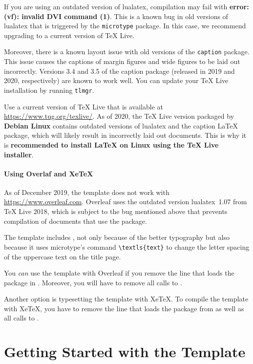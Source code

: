 If you are using an outdated version of lualatex, compilation may fail with \textbf{error: (vf): invalid DVI command (1)}. This is a known bug in old versions of lualatex that is triggered by the \texttt{microtype} package. In this case, we recommend upgrading to a current version of TeX Live.

Moreover, there is a known layout issue with old versions of the \texttt{caption} package. This issue causes the captions of margin figures and wide figures to be laid out incorrectly. Versions 3.4 and 3.5 of the caption package (released in 2019 and 2020, respectively) are known to work well. You can update your TeX Live installation by running \texttt{tlmgr}.

Use a current version of TeX Live that is available at \url{https://www.tug.org/texlive/}. As of 2020, the TeX Live version packaged by \textbf{Debian Linux} contains outdated versions of lualatex and the caption LaTeX package, which will likely result in incorrectly laid out documents. This is why it is \textbf{recommended to install LaTeX on Linux using the TeX Live installer}.

\paragraph{Using Overlaf and XeTeX}

As of December 2019, the template does not work with \url{https://www.overleaf.com}. Overleaf uses the outdated version lualatex~1.07 from TeX Live 2018, which is subject to the bug mentioned above that prevents compilation of documents that use the  package.

The template includes , not only because of the better typography but also because it uses microtype's command \verb|\textls{text}| to change the letter spacing of the uppercase text on the title page.

You \emph{can} use the template with Overleaf if you remove the line that loads the  package in . Moreover, you will have to remove all calls to .

Another option is typesetting the template with XeTeX. To compile the template with XeTeX, you have to remove the line that loads the package  from  as well as all calls to .


\section{Getting Started with the Template}

